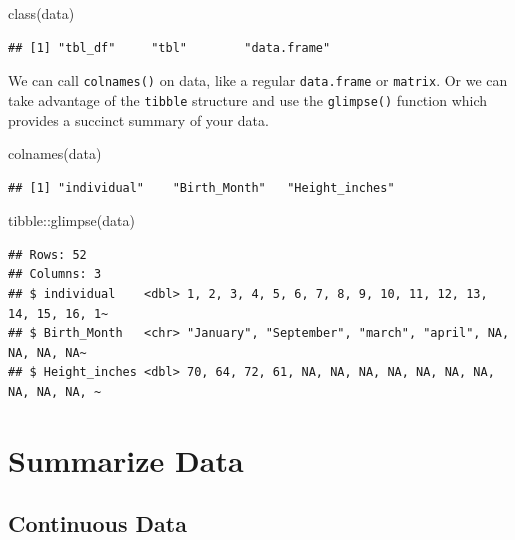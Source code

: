 \documentclass[
]{book}
\newenvironment{Shaded}{\begin{snugshade}}{\end{snugshade}}
\newcommand{\FunctionTok}[1]{\textcolor[rgb]{0.00,0.00,0.00}{#1}}
\newcommand{\NormalTok}[1]{#1}
\newcommand{\SpecialCharTok}[1]{\textcolor[rgb]{0.00,0.00,0.00}{#1}}
\begin{document}
\begin{Shaded}
\begin{Highlighting}[]
\FunctionTok{class}\NormalTok{(data)}
\end{Highlighting}
\end{Shaded}

\begin{verbatim}
## [1] "tbl_df"     "tbl"        "data.frame"
\end{verbatim}

We can call \texttt{colnames()} on data, like a regular \texttt{data.frame} or \texttt{matrix}. Or we can take advantage of the \texttt{tibble} structure and use the \texttt{glimpse()} function which provides a succinct summary of your data.

\begin{Shaded}
\begin{Highlighting}[]
\FunctionTok{colnames}\NormalTok{(data)}
\end{Highlighting}
\end{Shaded}

\begin{verbatim}
## [1] "individual"    "Birth_Month"   "Height_inches"
\end{verbatim}

\begin{Shaded}
\begin{Highlighting}[]
\NormalTok{tibble}\SpecialCharTok{::}\FunctionTok{glimpse}\NormalTok{(data)}
\end{Highlighting}
\end{Shaded}

\begin{verbatim}
## Rows: 52
## Columns: 3
## $ individual    <dbl> 1, 2, 3, 4, 5, 6, 7, 8, 9, 10, 11, 12, 13, 14, 15, 16, 1~
## $ Birth_Month   <chr> "January", "September", "march", "april", NA, NA, NA, NA~
## $ Height_inches <dbl> 70, 64, 72, 61, NA, NA, NA, NA, NA, NA, NA, NA, NA, NA, ~
\end{verbatim}

\hypertarget{summarize-data}{%
\section*{Summarize Data}\label{summarize-data}}

\hypertarget{continuous-data}{%
\subsection*{Continuous Data}\label{continuous-data}}
\end{document}
